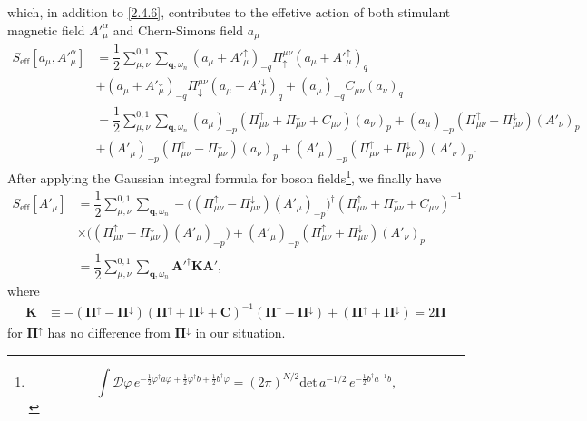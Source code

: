 \documentclass[bachelor,english,numbers]{ustcthesis}
\begin{document}
		which, in addition to \eqref{2.4.6}, contributes to the effetive action of both stimulant magnetic field ${A'}^\alpha_\mu$ and Chern-Simons field $a_\mu$
		\begin{align}
			S_\text{eff}[a_\mu,{A'}^\alpha_\mu]&=\dfrac{1}{2}\sum_{\mu,\nu}^{0,1}\sum_{\bm{q},\omega_n}\left(a_\mu+{A'}_\mu^\uparrow\right)_{-q}\Pi^{\mu\nu}_\uparrow\left(a_\mu+{A'}_\mu^\uparrow\right)_{q}\nonumber\\
			&+\left(a_\mu+{A'}_\mu^\downarrow\right)_{-q}\Pi^{\mu\nu}_\downarrow\left(a_\mu+{A'}_\mu^\downarrow\right)_{q}+(a_\mu)_{-q}C_{\mu\nu}(a_\nu)_q\nonumber\\
			&=\dfrac{1}{2}\sum_{\mu,\nu}^{0,1}\sum_{\bm{q},\omega_n}(a_\mu)_{-p}\left(\Pi_{\mu\nu}^\uparrow+\Pi_{\mu\nu}^\downarrow+C_{\mu\nu}\right)(a_\nu)_p+(a_\mu)_{-p}(\Pi_{\mu\nu}^\uparrow-\Pi_{\mu\nu}^\downarrow)(A'_\nu)_p\nonumber\\
			&+(A'_\mu)_{-p}(\Pi_{\mu\nu}^\uparrow-\Pi_{\mu\nu}^\downarrow)(a_\nu)_p+(A'_\mu)_{-p}(\Pi_{\mu\nu}^\uparrow+\Pi_{\mu\nu}^\downarrow)(A'_\nu)_p\label{2.5.3}.
		\end{align}
		After applying the Gaussian integral formula for boson fields\footnote{
		\begin{equation*}
			\int\mathcal{D}\varphi\,e^{-\frac{1}{2}\varphi^\dagger a \varphi+\frac{1}{2}\varphi^\dagger b+\frac{1}{2}b^\dagger \varphi}=(2\pi)^{N/2}\mathrm{det}\,a^{-1/2}\,e^{-\frac{1}{2}b^\dagger a^{-1} b},
		\end{equation*}}, we finally have
		\begin{align}
			S_{\text{eff}}[A'_\mu]&=\dfrac{1}{2}\sum_{\mu,\nu}^{0,1}\sum_{\bm{q},\omega_n}-\bigg((\Pi_{\mu\nu}^\uparrow-\Pi_{\mu\nu}^\downarrow)(A'_\mu)_{-p}\bigg)^\dagger\left(\Pi_{\mu\nu}^\uparrow+\Pi_{\mu\nu}^\downarrow+C_{\mu\nu}\right)^{-1}\nonumber\\
			&\times\bigg((\Pi_{\mu\nu}^\uparrow-\Pi_{\mu\nu}^\downarrow)(A'_\mu)_{-p}\bigg)+(A'_\mu)_{-p}(\Pi_{\mu\nu}^\uparrow+\Pi_{\mu\nu}^\downarrow)(A'_\nu)_p\nonumber\\
			&=\dfrac{1}{2}\sum_{\mu,\nu}^{0,1}\sum_{\bm{q},\omega_n}\bm{A'}^\dagger\bm{K}\bm{A'},\label{2.5.4}
		\end{align}
		where
		\begin{align}\label{2.5.4}
			\bm{K}&\equiv-(\bm{\Pi}^\uparrow-\bm{\Pi}^\downarrow)(\bm{\Pi}^\uparrow+\bm{\Pi}^\downarrow+\bm{C})^{-1}(\bm{\Pi}^\uparrow-\bm{\Pi}^\downarrow)+(\bm{\Pi}^\uparrow+\bm{\Pi}^\downarrow)=2\bm{\Pi}
		\end{align}
		for $\bm{\Pi}^\uparrow$ has no difference from $\bm{\Pi}^\downarrow$ in our situation.\par
\end{document}
